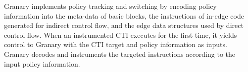 \documentclass[preprint]{sigplanconf}
\newcommand{\toolname}[1]{{\scshape #1}}
\begin{document}



Granary implements policy tracking and switching by encoding policy information into the meta-data of basic blocks, the instructions of in-edge code generated for indirect control flow, and the edge data structures used by direct control flow. When an instrumented CTI executes for the first time, it yields control to Granary with the CTI target and policy information as inputs. Granary decodes and instruments the targeted instructions according to the input policy information.
\end{document}
